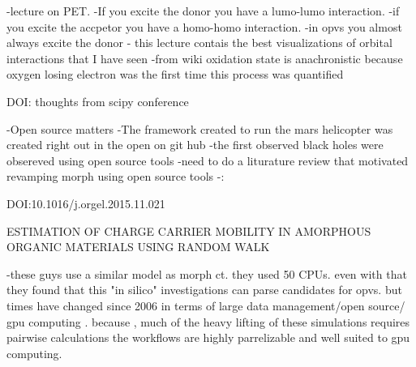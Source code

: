     -lecture on PET. 
    -If you excite the donor you have a lumo-lumo interaction.
    -if you excite the accpetor you have a homo-homo interaction.
    -in opvs you almost always excite the donor
    - this lecture contais the best visualizations of orbital interactions that I have seen
    -from wiki oxidation state is anachronistic because oxygen losing electron was the first time
    this process was quantified


DOI: thoughts from scipy conference

    -Open source matters
    -The framework created to run the mars helicopter was created right out in the open on git hub
    -the first observed black holes were obsereved using open source tools
    -need to do a liturature review that motivated revamping morph using open source tools
    -:


DOI:10.1016/j.orgel.2015.11.021
    
    ESTIMATION OF CHARGE CARRIER MOBILITY IN AMORPHOUS ORGANIC MATERIALS USING RANDOM WALK


        -these guys use a similar model as morph ct. they used 50 CPUs. even with that they found
        that this "in silico" investigations can parse candidates for opvs. but times have changed since 
        2006 in terms of large data management/open source/ gpu computing . because , much of the heavy lifting
        of these simulations requires pairwise calculations the workflows are highly parrelizable and well
        suited to gpu computing.
